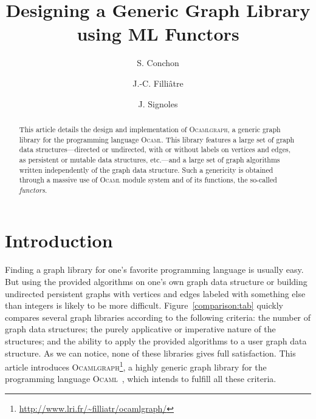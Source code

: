 \documentclass[]{tfp05symp}
\newcommand{\ocamlgraph}{\textsc{Ocamlgraph}\xspace}
\newcommand{\ocaml}{\textsc{Ocaml}\xspace}
\begin{document}


\title{Designing a Generic Graph Library \\ using ML Functors}

\author{S. Conchon\and J.-C. Filli\^atre\and J. Signoles}

\maketitle

\begin{abstract}
  This article details the design and implementation of \ocamlgraph, a
  generic graph library for the programming language \ocaml. This
  library features a large set of graph data structures---directed or
  undirected, with or without labels on vertices and edges, as persistent
  or mutable data structures, etc.---and a large set of graph
  algorithms written independently of the graph data structure. Such a
  genericity is obtained through a massive use of \ocaml module system
  and of its functions, the so-called \emph{functors}.
\end{abstract}




\section{Introduction}

Finding a graph library for one's favorite programming language is
usually easy. But using the provided algorithms on one's
own graph data structure or building undirected persistent graphs with
vertices and edges labeled with something else than integers is
likely to be more difficult. Figure~\ref{comparison:tab} quickly
compares several graph libraries according to the following criteria: 
the number of graph data structures; the purely applicative or
imperative nature of the structures; and the ability to apply the
provided algorithms to a user graph data structure.
As we can notice, none of these libraries gives full satisfaction.
This article introduces
\ocamlgraph\footnote{\url{http://www.lri.fr/~filliatr/ocamlgraph/}}, a
highly generic graph library for the programming language
\ocaml~\cite{ObjectiveCaml}, which intends to fulfill all 
these criteria.
\end{document}
